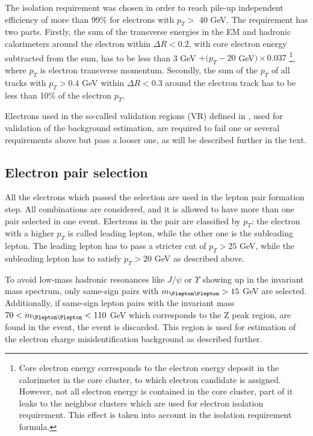The isolation requirement was chosen in order to reach pile-up independent efficiency of more than 99$\%$ for electrons 
with $p_T >$ 40 GeV. The requirement has two parts.
Firstly, the sum of the transverse energies in the EM and hadronic calorimeters around the electron within 
$\Delta R < 0.2$, with core electron energy subtracted from the sum, has to be less than 
3 GeV $+ (p_T - 20$ GeV$) \times 0.037$
\footnote{
Core electron energy corresponds to the electron energy deposit in the calorimeter in the core cluster, to which electron candidate is assigned. However, not all electron energy is contained in the core cluster, part of it leaks to the neighbor clusters which are used for electron isolation requirement. This effect is taken into account in the isolation requirement formula.}, 
where $p_T$ is electron transverse momentum.
Secondly, the sum of the $p_T$ of all tracks with $p_T > 0.4$ GeV within $\Delta R < 0.3$ around the electron track has
to be less than 10$\%$ of the electron $p_T$.

Electrons used in the so-called validation regions (VR) defined in , used for validation of the background estimation, 
are required to fail one or several requirements above but pass a looser one, as will be described further in the text.

\subsection{Electron pair selection}
All the electrons which passed the selection are used in the lepton pair formation step.
All combinations are considered, and it is allowed to have more than one pair selected in one event.
Electrons in the pair are classified by $p_T$: the electron with a higher $p_T$ is called leading lepton, while the other one is the subleading lepton.
The leading lepton has to pass a stricter cut of $p_T>25$ GeV, while the subleading lepton has to satisfy $p_T>20$ GeV as described above.

To avoid low-mass hadronic resonances like $J/\psi$ or $\varUpsilon$ showing up in the invariant mass spectrum, 
only same-sign pairs with $m_{\Plepton\Plepton}>15$ GeV are selected.
Additionally, if same-sign lepton pairs with the invariant mass $70 < m_{\Plepton\Plepton}< 110$ GeV 
which corresponds to the Z peak region, are found in the event, the event is discarded.
This region is used for estimation of the electron charge misidentification background as described further.

